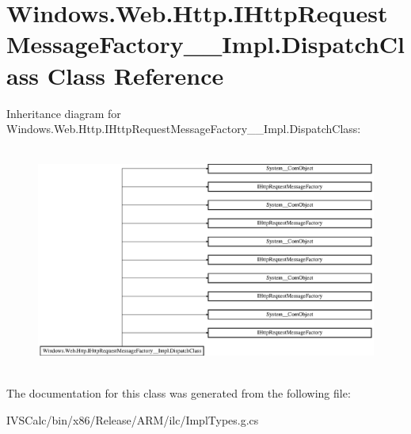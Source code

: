 \hypertarget{class_windows_1_1_web_1_1_http_1_1_i_http_request_message_factory_____impl_1_1_dispatch_class}{}\section{Windows.\+Web.\+Http.\+I\+Http\+Request\+Message\+Factory\+\_\+\+\_\+\+Impl.\+Dispatch\+Class Class Reference}
\label{class_windows_1_1_web_1_1_http_1_1_i_http_request_message_factory_____impl_1_1_dispatch_class}
Inheritance diagram for Windows.\+Web.\+Http.\+I\+Http\+Request\+Message\+Factory\+\_\+\+\_\+\+Impl.\+Dispatch\+Class\+:\begin{figure}[H]
\begin{center}
\leavevmode
\includegraphics[height=7.457627cm]{class_windows_1_1_web_1_1_http_1_1_i_http_request_message_factory_____impl_1_1_dispatch_class}
\end{center}
\end{figure}


The documentation for this class was generated from the following file\+:\begin{DoxyCompactItemize}
\item 
I\+V\+S\+Calc/bin/x86/\+Release/\+A\+R\+M/ilc/Impl\+Types.\+g.\+cs\end{DoxyCompactItemize}
